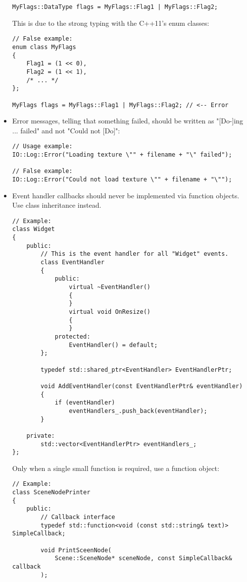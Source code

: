 \documentclass{article}
\begin{document}
\begin{itemize}
\begin{lstlisting}
MyFlags::DataType flags = MyFlags::Flag1 | MyFlags::Flag2;
\end{lstlisting}

This is due to the strong typing with the C++11's enum classes:

\begin{lstlisting}
// False example:
enum class MyFlags
{
	Flag1 = (1 << 0),
	Flag2 = (1 << 1),
	/* ... */
};

MyFlags flags = MyFlags::Flag1 | MyFlags::Flag2; // <-- Error
\end{lstlisting}

\item
Error messages, telling that something failed, should be written as "[Do-]ing ... failed" and not "Could not [Do]":

\begin{lstlisting}
// Usage example:
IO::Log::Error("Loading texture \"" + filename + "\" failed");

// False example:
IO::Log::Error("Could not load texture \"" + filename + "\"");
\end{lstlisting}
  
\item
Event handler callbacks should never be implemented via function objects. Use class inheritance instead.

\begin{lstlisting}
// Example:
class Widget
{
	public:
		// This is the event handler for all "Widget" events.
		class EventHandler
		{
			public:
				virtual ~EventHandler()
				{
				}
				virtual void OnResize()
				{
				}
			protected:
				EventHandler() = default;
		};
		
		typedef std::shared_ptr<EventHandler> EventHandlerPtr;
		
		void AddEventHandler(const EventHandlerPtr& eventHandler)
		{
			if (eventHandler)
				eventHandlers_.push_back(eventHandler);
		}
		
	private:
		std::vector<EventHandlerPtr> eventHandlers_;
};
\end{lstlisting}

Only when a single small function is required, use a function object:

\begin{lstlisting}
// Example:
class SceneNodePrinter
{
	public:
		// Callback interface
		typedef std::function<void (const std::string& text)> SimpleCallback;
		
		void PrintSceenNode(
			Scene::SceneNode* sceneNode, const SimpleCallback& callback
		);
		

\end{lstlisting}
\end{itemize}
\end{document}
